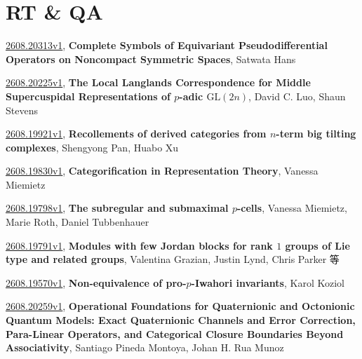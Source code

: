 \documentclass[9pt, a4paper]{article}
\theoremstyle{plain}
\theoremstyle{definition}
\theoremstyle{remark}
\newcommand{\arxiv}[3]{\href{https://arxiv.org/abs/#1}{#1}, \textbf{\textcolor{arxivblue}{#2}}, #3}
\begin{document}

\section{RT \& QA}
\arxiv{2608.20313v1}{Complete Symbols of Equivariant Pseudodifferential Operators on Noncompact Symmetric Spaces}{Satwata Hans}

\arxiv{2608.20225v1}{The Local Langlands Correspondence for Middle Supercuspidal Representations of $p$-adic $\text{GL}(2n)$}{David C. Luo, Shaun Stevens}

\arxiv{2608.19921v1}{Recollements of derived categories from $n$-term big tilting complexes}{Shengyong Pan, Huabo Xu}

\arxiv{2608.19830v1}{Categorification in Representation Theory}{Vanessa Miemietz}

\arxiv{2608.19798v1}{The subregular and submaximal $p$-cells}{Vanessa Miemietz, Marie Roth, Daniel Tubbenhauer}

\arxiv{2608.19791v1}{Modules with few Jordan blocks for rank $1$ groups of Lie type and related groups}{Valentina Grazian, Justin Lynd, Chris Parker 等}

\arxiv{2608.19570v1}{Non-equivalence of pro-$p$-Iwahori invariants}{Karol Koziol}

\arxiv{2608.20259v1}{Operational Foundations for Quaternionic and Octonionic Quantum Models: Exact Quaternionic Channels and Error Correction, Para-Linear Operators, and Categorical Closure Boundaries Beyond Associativity}{Santiago Pineda Montoya, Johan H. Rua Munoz}

\end{document}

